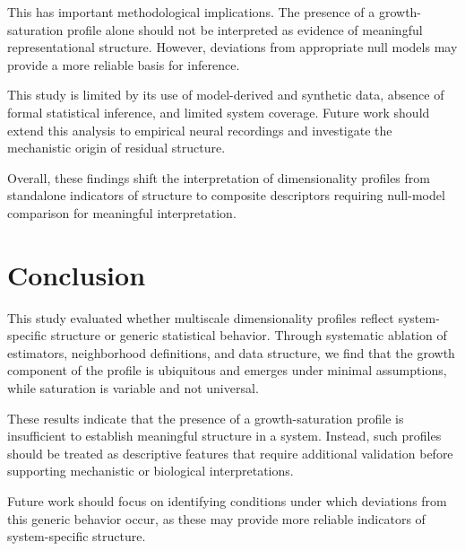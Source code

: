 This has important methodological implications. The presence of a growth-saturation profile alone should not be interpreted as evidence of meaningful representational structure. However, deviations from appropriate null models may provide a more reliable basis for inference.

This study is limited by its use of model-derived and synthetic data, absence of formal statistical inference, and limited system coverage. Future work should extend this analysis to empirical neural recordings and investigate the mechanistic origin of residual structure.

Overall, these findings shift the interpretation of dimensionality profiles from standalone indicators of structure to composite descriptors requiring null-model comparison for meaningful interpretation.

\section{Conclusion}

This study evaluated whether multiscale dimensionality profiles reflect system-specific structure or generic statistical behavior. Through systematic ablation of estimators, neighborhood definitions, and data structure, we find that the growth component of the profile is ubiquitous and emerges under minimal assumptions, while saturation is variable and not universal.

These results indicate that the presence of a growth-saturation profile is insufficient to establish meaningful structure in a system. Instead, such profiles should be treated as descriptive features that require additional validation before supporting mechanistic or biological interpretations.

Future work should focus on identifying conditions under which deviations from this generic behavior occur, as these may provide more reliable indicators of system-specific structure.

